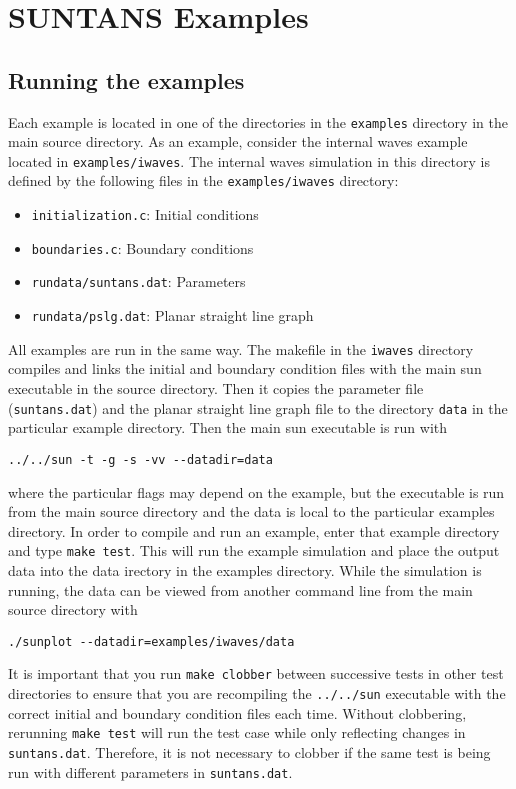 \section{SUNTANS Examples} \label{sec:examples}

\subsection{Running the examples}

Each example is located in one of the directories in the \verb+examples+ directory in
the main source directory.  As an example, consider the internal waves example located
in \verb+examples/iwaves+.  The internal waves simulation in this directory is defined by the following files
in the \verb+examples/iwaves+ directory:
\begin{itemize}
\item \verb+initialization.c+: Initial conditions
\item \verb+boundaries.c+: Boundary conditions
\item \verb+rundata/suntans.dat+: Parameters
\item \verb+rundata/pslg.dat+: Planar straight line graph
\end{itemize}
All examples are run in the same way.
The makefile in the \verb+iwaves+ directory compiles and links the initial and boundary condition
files with the main sun executable in the source directory.  Then it copies the parameter
file (\verb+suntans.dat+) and the planar straight line graph file to the directory \verb+data+ in
the particular example directory.  Then the main sun executable is run with
\begin{verbatim}
../../sun -t -g -s -vv --datadir=data
\end{verbatim}
where the particular flags may depend on the example, but the executable is run from
the main source directory and the data is local to the particular examples directory.
In order to compile and run an example, enter that example
directory and type \verb+make test+.  This will run the example simulation and place
the output data into the data irectory in the examples directory.
While the simulation is running, the data can be viewed from another command line
from the main source directory with
\begin{verbatim}
./sunplot --datadir=examples/iwaves/data
\end{verbatim}
It is important that you run \verb+make clobber+ between successive tests in other
test directories to ensure that you are recompiling the \verb+../../sun+ executable
with the correct initial and boundary condition files each time.  Without clobbering,
rerunning \verb+make test+ will run the test case while only reflecting changes in \verb+suntans.dat+.
Therefore, it is not necessary to clobber if the same test is being run with different 
parameters in \verb+suntans.dat+.

